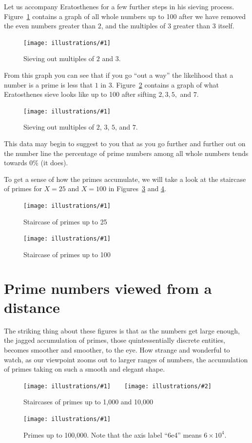 \documentclass[openany]{book}
\newcommand{\ill}[3]{%
   \begin{figure}[H]%
   \vspace{-2ex}
   \centering%
   \texttt{[image: illustrations/\#1]}%
   \caption{#3}%
   \vspace{-2ex}
    \end{figure}}
\newcommand{\illtwo}[4]{%
   \begin{figure}[H]\centering%
   \texttt{[image: illustrations/\#1]}$\qquad$\texttt{[image: illustrations/\#2]}%
   \caption{#4}%
    \end{figure}}
\theoremstyle{plain}
\theoremstyle{definition}
\begin{document}
                                 
Let us accompany Eratosthenes for a few further steps in his sieving
process.  Figure~\ref{fig:sieve3_100} contains a graph of all whole
numbers up to 100 after we have removed the even numbers greater than
$2$, and the multiples of $3$ greater than $3$ itself.
                                 

\ill{sieves3_100}{.7}{Sieving out multiples of $2$ and $3$.\label{fig:sieve3_100}}


From this graph you can see that if you go ``out a way'' the
likelihood that a number is a prime is less that $1$ in $3
$. Figure~\ref{fig:sieve7_100} contains a graph of what Eratosthenes
sieve looks like up to 100 after sifting $2,3,5,$ and $7$.



\ill{sieves7_100}{.7}{Sieving out multiples of $2$, $3$, $5$, and $7$.\label{fig:sieve7_100}}


This data may begin to suggest to you that as you go further and
further out on the number line the percentage of prime numbers among
all whole numbers tends towards $0\%$ (it does).
  

To get a sense of how the primes accumulate, we will take a look at
the staircase of primes for $X= 25$ and $X=100$ in Figures~\ref{fig:staircase25}
and \ref{fig:staircase100a}.

\ill{prime_pi_25_aspect1}{.8}{Staircase of primes up to 25\label{fig:staircase25}}
\ill{prime_pi_100_aspect1}{.8}{Staircase of primes up to 100\label{fig:staircase100a}}

    
    
\chapter{Prime numbers viewed from a distance}
The striking thing about these figures is that as the numbers get
large enough, the jagged accumulation of primes, those
quintessentially discrete entities, becomes smoother and smoother, to
the eye. How strange and wonderful to watch, as our viewpoint zooms
out to larger ranges of numbers, the accumulation of primes taking on
such a smooth and elegant shape.

\illtwo{prime_pi_1000}{prime_pi_10000}{0.4}{Staircases of primes up to 1,000 and 10,000\label{fig:staircases2}}

\ill{prime_pi_100000}{.8}{Primes up to 100,000\label{fig:pn100000}.  
Note that the axis label ``6e4'' means $6 \times 10^4$.}
\end{document}
